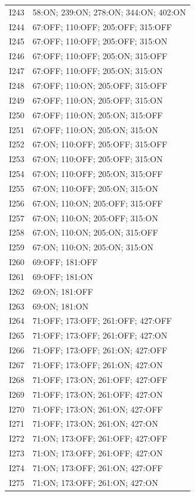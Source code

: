 {\begin{longtable}{lp{.85\linewidth}}
I243 & 58:ON; 239:ON; 278:ON; 344:ON; 402:ON \\
I244 & 67:OFF; 110:OFF; 205:OFF; 315:OFF \\
I245 & 67:OFF; 110:OFF; 205:OFF; 315:ON \\
I246 & 67:OFF; 110:OFF; 205:ON; 315:OFF \\
I247 & 67:OFF; 110:OFF; 205:ON; 315:ON \\
I248 & 67:OFF; 110:ON; 205:OFF; 315:OFF \\
I249 & 67:OFF; 110:ON; 205:OFF; 315:ON \\
I250 & 67:OFF; 110:ON; 205:ON; 315:OFF \\
I251 & 67:OFF; 110:ON; 205:ON; 315:ON \\
I252 & 67:ON; 110:OFF; 205:OFF; 315:OFF \\
I253 & 67:ON; 110:OFF; 205:OFF; 315:ON \\
I254 & 67:ON; 110:OFF; 205:ON; 315:OFF \\
I255 & 67:ON; 110:OFF; 205:ON; 315:ON \\
I256 & 67:ON; 110:ON; 205:OFF; 315:OFF \\
I257 & 67:ON; 110:ON; 205:OFF; 315:ON \\
I258 & 67:ON; 110:ON; 205:ON; 315:OFF \\
I259 & 67:ON; 110:ON; 205:ON; 315:ON \\
I260 & 69:OFF; 181:OFF \\
I261 & 69:OFF; 181:ON \\
I262 & 69:ON; 181:OFF \\
I263 & 69:ON; 181:ON \\
I264 & 71:OFF; 173:OFF; 261:OFF; 427:OFF \\
I265 & 71:OFF; 173:OFF; 261:OFF; 427:ON \\
I266 & 71:OFF; 173:OFF; 261:ON; 427:OFF \\
I267 & 71:OFF; 173:OFF; 261:ON; 427:ON \\
I268 & 71:OFF; 173:ON; 261:OFF; 427:OFF \\
I269 & 71:OFF; 173:ON; 261:OFF; 427:ON \\
I270 & 71:OFF; 173:ON; 261:ON; 427:OFF \\
I271 & 71:OFF; 173:ON; 261:ON; 427:ON \\
I272 & 71:ON; 173:OFF; 261:OFF; 427:OFF \\
I273 & 71:ON; 173:OFF; 261:OFF; 427:ON \\
I274 & 71:ON; 173:OFF; 261:ON; 427:OFF \\
I275 & 71:ON; 173:OFF; 261:ON; 427:ON \\

\end{longtable}}
